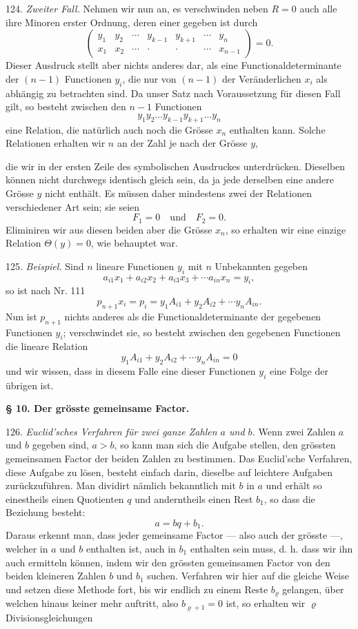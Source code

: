 124. \textit{Zweiter Fall.} Nehmen wir nun an, es verschwinden neben $R = 0$ auch alle ihre Minoren erster Ordnung, deren einer gegeben ist durch
\[
\begin{pmatrix} y_1 & y_2 & \cdots & y_{k-1} & y_{k+1} & \cdots & y_n \\ x_1 & x_2 & \cdots & \cdot & \cdot & \cdots & x_{n-1} \end{pmatrix} = 0.
\]
Dieser Ausdruck stellt aber nichts anderes dar, als eine Functionaldeterminante der $(n-1)$ Functionen $y_i$, die nur von $(n-1)$ der Veränderlichen $x_i$ als abhängig zu betrachten sind. Da unser Satz nach Voraussetzung für diesen Fall gilt, so besteht zwischen den $n-1$ Functionen
\[
y_1 y_2 \ldots y_{k-1} y_{k+1} \ldots y_n
\]
eine Relation, die natürlich auch noch die Grösse $x_n$ enthalten kann. Solche Relationen erhalten wir $n$ an der Zahl je nach der Grösse $y$,


die wir in der ersten Zeile des symbolischen Ausdruckes unterdrücken. Dieselben können nicht durchwegs identisch gleich sein, da ja jede derselben eine andere Grösse $y$ nicht enthält. Es müssen daher mindestens zwei der Relationen verschiedener Art sein; sie seien
\[ F_1 = 0 \quad \text{und} \quad F_2 = 0. \]
Eliminiren wir aus diesen beiden aber die Grösse $x_n$, so erhalten wir eine einzige Relation $\Theta(y) = 0$, wie behauptet war.

125. \textit{Beispiel.} Sind $n$ lineare Functionen $y_i$ mit $n$ Unbekannten gegeben
\[ a_{i1} x_1 + a_{i2} x_2 + a_{i3} x_3 + \cdots a_{in} x_n = y_i, \]
so ist nach Nr. 111
\[ p_{n+1} x_i = p_i = y_1 A_{i1} + y_2 A_{i2} + \cdots y_n A_{in}. \]
Nun ist $p_{n+1}$ nichts anderes als die Functionaldeterminante der gegebenen Functionen $y_i$; verschwindet sie, so besteht zwischen den gegebenen Functionen die lineare Relation
\[ y_1 A_{i1} + y_2 A_{i2} + \cdots y_n A_{in} = 0 \]
und wir wissen, dass in diesem Falle eine dieser Functionen $y_i$ eine Folge der übrigen ist.

\textbf{§ 10. Der grösste gemeinsame Factor.}

126. \textit{Euclid'sches Verfahren für zwei ganze Zahlen $a$ und $b$.} Wenn zwei Zahlen $a$ und $b$ gegeben sind, $a > b$, so kann man sich die Aufgabe stellen, den grössten gemeinsamen Factor der beiden Zahlen zu bestimmen. Das Euclid'sche Verfahren, diese Aufgabe zu lösen, besteht einfach darin, dieselbe auf leichtere Aufgaben zurückzuführen. Man dividirt nämlich bekanntlich mit $b$ in $a$ und erhält so einestheils einen Quotienten $q$ und anderntheils einen Rest $b_1$, so dass die Beziehung besteht:
\[ a = bq + b_1. \]
Daraus erkennt man, dass jeder gemeinsame Factor — also auch der grösste —, welcher in $a$ und $b$ enthalten ist, auch in $b_1$ enthalten sein muss, d. h. dass wir ihn auch ermitteln können, indem wir den grössten gemeinsamen Factor von den beiden kleineren Zahlen $b$ und $b_1$ suchen. Verfahren wir hier auf die gleiche Weise und setzen diese Methode fort, bis wir endlich zu einem Reste $b_\varrho$ gelangen, über welchen hinaus keiner mehr auftritt, also $b_{\varrho+1} = 0$ ist, so erhalten wir $\varrho$ Divisionsgleichungen



